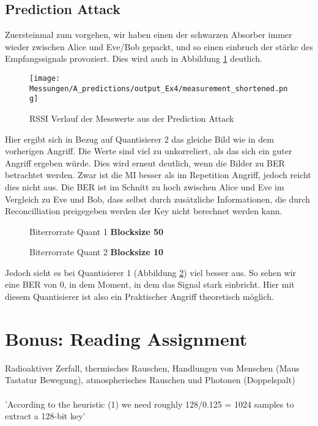 \documentclass[12pt,a4paper]{article}
\begin{document}
\subsection*{Prediction Attack}
Zuersteinmal zum vorgehen, wir haben einen der schwarzen Absorber immer wieder zwischen Alice und Eve/Bob gepackt, und so einen einbruch der stärke des Empfangssignals provoziert. Dies wird auch in Abbildung \ref{fig:12} deutlich.\\
\begin{figure}[H]
\centering
\texttt{[image: Messungen/A\_predictions/output\_Ex4/measurement\_shortened.png]}
\caption{RSSI Verlauf der Messwerte aus der Prediction Attack}
\label{fig:12}
\end{figure}
Hier ergibt sich in Bezug auf Quantisierer 2 das gleiche Bild wie in dem vorherigen Angriff. Die Werte sind viel zu unkorreliert, als das sich ein guter Angriff ergeben würde. Dies wird erneut deutlich, wenn die Bilder zu BER betrachtet werden. Zwar ist die MI besser als im Repetition Angriff, jedoch reicht dies nicht aus. Die BER ist im Schnitt zu hoch zwischen Alice und Eve im Vergleich zu Eve und Bob, dass selbst durch zusätzliche Informationen, die durch Reconcilliation preigegeben werden der Key nicht berechnet werden kann.
\begin{figure}[H]
\centering
{} \qquad
{}  
\caption{Biterrorrate Quant 1 \textbf{Blocksize 50}}
\label{fig:13}
\end{figure}
\begin{figure}[H]
\centering
{} \qquad
{}  
\caption{Biterrorrate Quant 2 \textbf{Blocksize 10}}
\label{fig:14}
\end{figure}
Jedoch sieht es bei Quantisierer 1 (Abbildung \ref{fig:13}) viel besser aus. So sehen wir eine BER von 0, in dem Moment, in dem das Signal stark einbricht. Hier mit diesem Quantisierer ist also ein Praktischer Angriff theoretisch möglich. 
\section{Bonus: Reading Assignment}
Radioaktiver Zerfall, thermisches Rauschen, Handlungen von Menschen (Maus Tastatur Bewegung), atmospherisches Rauschen und Photonen (Doppelspalt)\\
\\
'According to the heuristic (1) we need roughly 128/0.125 = 1024
samples to extract a 128-bit key'\\
\\
\end{document}
